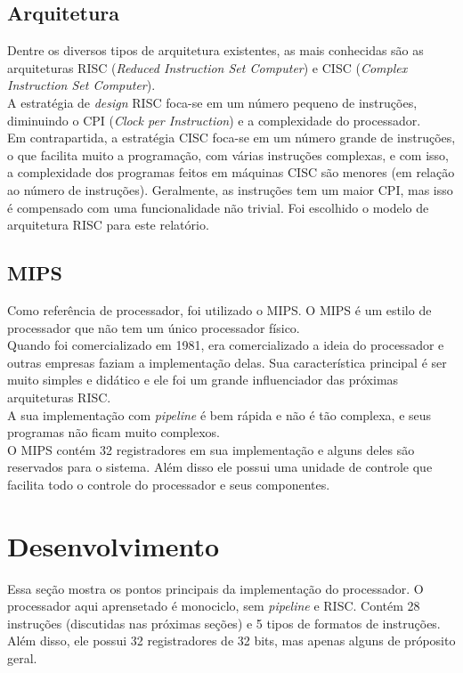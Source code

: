 \documentclass[a4paper, 12pt]{article}
\begin{document}
\subsection{Arquitetura}
Dentre os diversos tipos de arquitetura existentes, as mais conhecidas são as arquiteturas RISC (\textit{Reduced Instruction Set Computer}) e CISC (\textit{Complex Instruction Set Computer}).\\
A estratégia de \textit{design} RISC foca-se em um número pequeno de instruções, diminuindo o CPI (\textit{Clock per Instruction}) e a complexidade do processador.\\
Em contrapartida, a estratégia CISC foca-se em um número grande de instruções, o que facilita muito a programação, com várias instruções complexas, e com isso, a complexidade dos programas feitos em máquinas CISC são menores (em relação ao número de instruções).
Geralmente, as instruções tem um maior CPI, mas isso é compensado com uma funcionalidade não trivial.
Foi escolhido o modelo de arquitetura RISC para este relatório.\\

\subsection{MIPS}
Como referência de processador, foi utilizado o MIPS. O MIPS é um estilo de processador que não tem um único processador físico. 
\\
Quando foi comercializado em 1981, era comercializado a ideia do processador e outras empresas faziam a implementação delas. Sua característica principal é ser muito simples e didático e ele foi um grande influenciador das próximas arquiteturas RISC.\\
A sua implementação com \textit{pipeline} é bem rápida e não é tão complexa, e seus programas não ficam muito complexos.\\
O MIPS contém 32 registradores em sua implementação e alguns deles são reservados para o sistema. Além disso ele possui uma unidade de controle que facilita todo o controle do processador e seus componentes.\\

\newpage
\section{Desenvolvimento}
Essa seção mostra os pontos principais da implementação do processador. O processador aqui aprensetado é monociclo, sem \textit{pipeline} e RISC. Contém 28 instruções (discutidas nas próximas seções) e 5 tipos de formatos de instruções.\\
Além disso, ele possui 32 registradores de 32 bits, mas apenas alguns de próposito geral.
\end{document}
